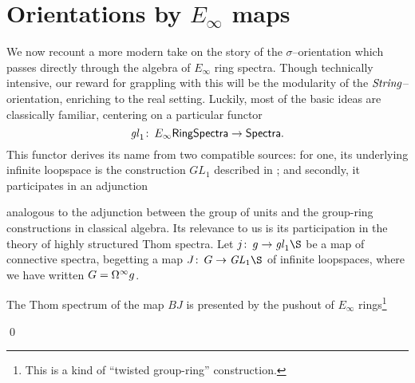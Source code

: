 \section{Orientations by \texorpdfstring{$E_\infty$}{Eoo} maps}\label{JuvitopTalkSection}

We now recount a more modern take on the story of the $\sigma$--orientation which passes directly through the algebra of $E_\infty$ ring spectra.  Though technically intensive, our reward for grappling with this will be the modularity of the $\mathit{String}$--orientation, enriching  to the real setting.  Luckily, most of the basic ideas are classically familiar, centering on a particular functor \[\mathit{gl}_1\colon\thinspace E_\infty\mathsf{RingSpectra} \to \mathsf{Spectra}.\]  This functor derives its name from two compatible sources: for one, its underlying infinite loopspace is the construction $GL_1$ described in ; and secondly, it participates in an adjunction
\begin{center}
\end{center}
analogous to the adjunction between the group of units and the group-ring constructions in classical algebra.  Its relevance to us is its participation in the theory of highly structured Thom spectra.  Let $j\co g \to \gl_1 \S$ be a map of connective spectra, begetting a map $J\co G \to \GL_1 \S$ of infinite loopspaces, where we have written $G = \Omega^\infty g$.
\begin{lemma}
The Thom spectrum of the map $BJ$ is presented by the pushout of $E_\infty$ rings\footnote{This is a kind of ``twisted group-ring'' construction.}
\begin{center}
\end{center}
\qed
\end{lemma}

